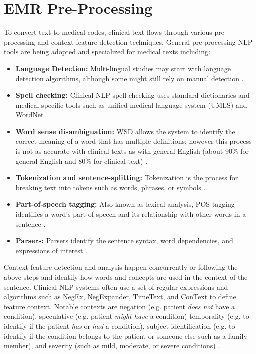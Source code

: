 \documentclass[sigconf]{acmart}
\begin{document}
\section{EMR Pre-Processing}
To convert text to medical codes, clinical text flows through various pre-processing and context feature detection techniques. General pre-processing NLP tools are being adopted and specialized for medical texts including:
\begin{itemize}
\item \textbf{Language Detection:} Multi-lingual studies may start with language detection algorithms, although some might still rely on manual detection \cite{diomaiuta2017novel}.
\item \textbf{Spell checking:} Clinical NLP spell checking uses standard dictionaries and medical-specific tools such as unified medical language system (UMLS) and WordNet \cite{meystre2008extracting}.
\item \textbf{Word sense disambiguation:} WSD allows the system to identify the correct meaning of a word that has multiple definitions; however this process is not as accurate with clinical texts as with general English (about 90\% for general English and 80\% for clinical text) \cite{meystre2008extracting}.
\item \textbf{Tokenization and sentence-splitting:}  Tokenization is the process for breaking text into tokens such as words, phrases, or symbols \cite{diomaiuta2017novel} \cite{tomanek2007sentence}.
\item \textbf{Part-of-speech tagging:} Also known as lexical analysis, POS tagging identifies a word's part of speech and its relationship with other words in a sentence \cite{diomaiuta2017novel} \cite{meystre2008extracting}.
\item \textbf{Parsers:} Parsers identify the sentence syntax, word dependencies, and expressions of interest \cite{diomaiuta2017novel} \cite{meystre2008extracting}.
\end{itemize}

Context feature detection and analysis happen concurrently or following the above steps and identify how words and concepts are used in the context of the sentence. Clinical NLP systems often use a set of regular expressions and algorithms such as NegEx, NegExpander, TimeText, and ConText to define feature context. Notable contexts are negation (e.g. patient \textit{does not} have a condition), speculative (e.g. patient \textit{might have} a condition) temporality (e.g. to identify if the patient \textit{has} or \textit{had} a condition), subject identification (e.g. to identify if the condition belongs to the patient or someone else such as a family member), and severity (such as mild, moderate, or severe conditions) \cite{meystre2008extracting} \cite{velupillai2015recent}.
\end{document}
